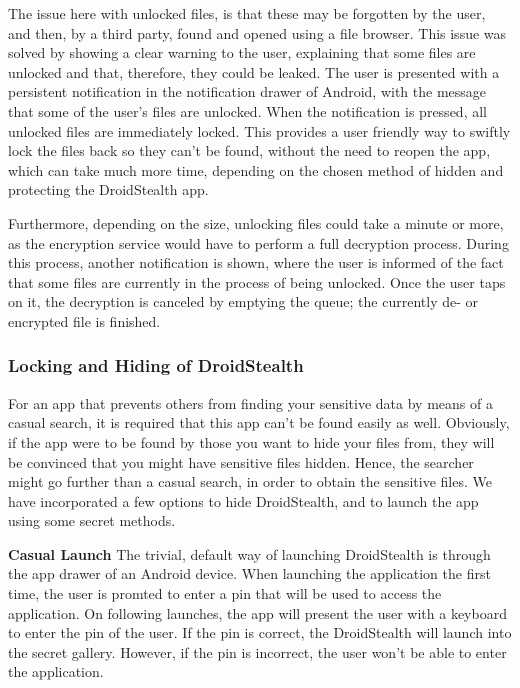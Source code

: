 The issue here with unlocked files, is that these may be
forgotten by the user, and then, by a third party, found and
opened using a file browser. This issue was solved by showing
a clear warning to the user, explaining that some files are
unlocked and that, therefore, they could be leaked.
The user is presented with a persistent notification in the
notification drawer of Android, with the message that some of
the user's files are unlocked. When the notification is pressed,
all unlocked files are immediately locked. This
provides a user friendly way to swiftly lock the files back so
they can't be found, without the need to reopen the app, which
can take much more time, depending on the chosen method of
hidden and protecting the DroidStealth app. 

Furthermore, depending on the size, unlocking files could take a
minute or more, as the encryption service would have to perform a
full decryption process. During this process, another notification 
is shown, where the user is informed
of the fact that some files are currently in the process of
being unlocked. Once the user taps on it, the decryption is
canceled by emptying the queue; the currently de- or encrypted file is finished.


\subsubsection{Locking and Hiding of DroidStealth}

For an app that prevents others from finding your sensitive
data by means of a casual search, it is required that this app
can't be found easily as well. Obviously, if the app were to be
found by those you want to hide your files from, they will be
convinced that you might have sensitive files hidden. Hence, the
searcher might go further than a casual search, in order to
obtain the sensitive files. We have incorporated a few options to hide 
DroidStealth, and to launch the app using some secret methods.

\textbf{Casual Launch}
The trivial, default way of launching DroidStealth is through the app drawer of an Android device. 
When launching the application the first time, the user is promted to enter a pin that will be used to access the application.
On following launches, the app will present the user with a keyboard to enter the pin of the user. If the pin is correct, the 
DroidStealth will launch into the secret gallery. However, if the pin is incorrect, the user won't be able to enter the application.


